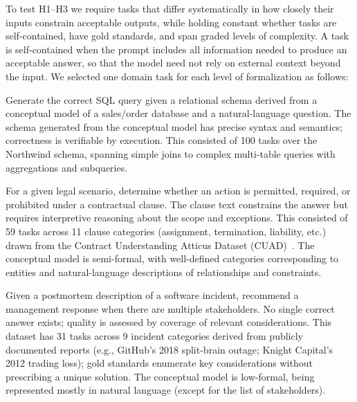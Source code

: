 \documentclass[runningheads]{llncs}
\begin{document}
To test H1--H3 we require tasks that differ systematically in how closely their inputs constrain acceptable outputs, while holding constant whether tasks are self-contained, have gold standards, and span graded levels of complexity. A task is self-contained when the prompt includes all information needed to produce an acceptable answer, so that the model need not rely on external context beyond the input. We selected one domain task for each level of formalization as follows:

\begin{description}[style=nextline]
  \item[High-formal: SQL generation]
    Generate the correct SQL query given a relational schema derived from a conceptual model of a sales/order database and a natural-language question. The schema generated from the conceptual model has precise syntax and semantics; correctness is verifiable by execution.
    This consisted of 100 tasks over the Northwind schema, spanning simple joins to complex multi-table queries with aggregations and subqueries.

  \item[Semi-formal: Legal clause interpretation]
    For a given legal scenario, determine whether an action is permitted, required, or prohibited under a contractual clause. The clause text constrains the answer but requires interpretive reasoning about the scope and exceptions.
    This consisted of 59 tasks across 11 clause categories (assignment, termination, liability, etc.) drawn from the Contract Understanding Atticus Dataset (CUAD)~\cite{hendrycks2021cuad}.  The conceptual model is semi-formal, with well-defined categories corresponding to entities and natural-language descriptions of relationships and constraints.

  \item[Low-formal: Management decision-making]
    Given a postmortem description of a software incident, recommend a management response when there are multiple stakeholders. No single correct answer exists; quality is assessed by coverage of relevant considerations.
    This dataset has 31 tasks across 9 incident categories derived from publicly documented reports (e.g., GitHub's 2018 split-brain outage; Knight Capital's 2012 trading loss); gold standards enumerate key considerations without prescribing a unique solution.  The conceptual model is low-formal, being represented mostly in natural language (except for the list of stakeholders).
\end{description}
\end{document}
